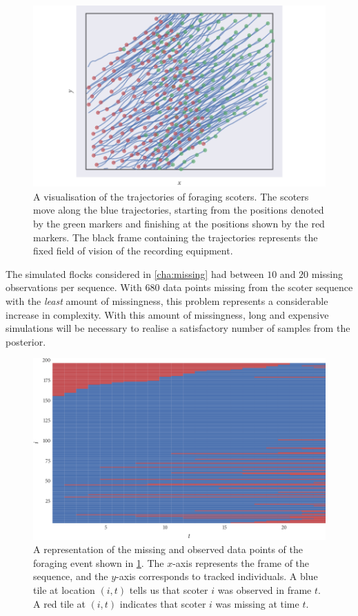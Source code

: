 \begin{figure}[tb]
  \includegraphics{data_00_traj.pdf}
  \caption{A visualisation of the trajectories of foraging scoters. The scoters
  move along the blue trajectories, starting from the positions denoted by the
  green markers and finishing at the positions shown by the red markers. The
  black frame containing the trajectories represents the fixed field of vision
  of the recording equipment.}
  \label{fig:scoter_traj}
\end{figure}

The simulated flocks considered in \cref{cha:missing} had between $10$ and $20$
missing observations per sequence. With $680$ data points missing from the
scoter sequence with the \emph{least} amount of missingness, this problem
represents a considerable increase in complexity. With this amount of
missingness, long and expensive simulations will be necessary to realise a
satisfactory number of samples from the posterior.

\begin{figure}[tb]
  \includegraphics{data_00_missing.pdf}
  \caption{A representation of the missing and observed data points of the
  foraging event shown in \cref{fig:scoter_traj}. The $x$-axis represents the
  frame of the sequence, and the $y$-axis corresponds to tracked individuals. A
  blue tile at location $(i,t)$ tells us that scoter $i$ was observed in frame
  $t$. A red tile at $(i,t)$ indicates that scoter $i$ was missing at time $t$.}
  \label{fig:scoter_missing}
\end{figure}

